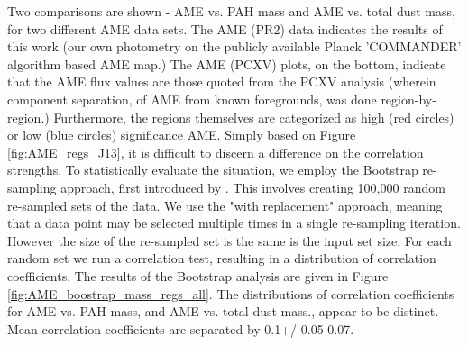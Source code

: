 \documentclass[preprint2,longabstract]{aastex}
\begin{document}
     Two comparisons are shown - AME vs. PAH mass and AME vs. total dust mass, for two different AME data sets. The AME (PR2) data indicates the results of this work (our own photometry on the publicly available Planck 'COMMANDER' algorithm based AME map.) The AME (PCXV) plots, on the bottom, indicate that the AME flux values are those quoted from the PCXV analysis (wherein component separation, of AME from known foregrounds, was done region-by-region.) Furthermore, the regions themselves are categorized as high (red circles) or low (blue circles) significance AME. Simply based on Figure \ref{fig:AME_regs_J13}, it is difficult to discern a difference on the correlation strengths. To statistically evaluate the situation, we employ the Bootstrap re-sampling approach, first introduced by \cite{efron79}. This involves creating 100,000 random re-sampled sets of the data. We use the "with replacement" approach, meaning that a data point may be selected multiple times in a single re-sampling iteration. However the size of the re-sampled set is the same is the input set size. For each random set we run a correlation test, resulting in a distribution of correlation coefficients. The results of the Bootstrap analysis are given in Figure \ref{fig:AME_boostrap_mass_regs_all}. The distributions of correlation coefficients for AME vs. PAH mass, and AME vs. total dust mass., appear to be distinct. Mean correlation coefficients are separated by 0.1+/-0.05-0.07.

\end{document}
